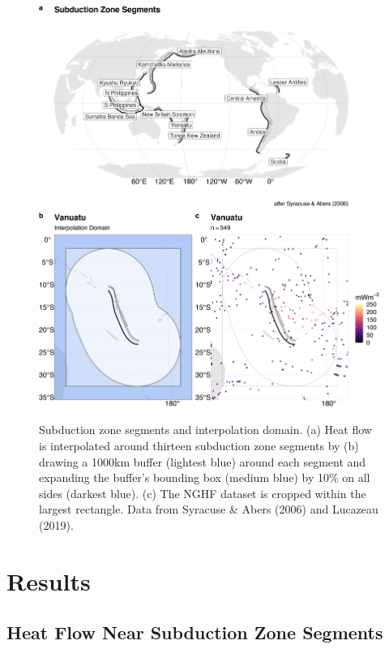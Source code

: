 \documentclass[draft,linenumbers]{agujournal2018}
\begin{document}
\begin{figure}[h]

{\centering \includegraphics[width=1\linewidth,]{../figs/base/segs_comp} 

}

\caption{Subduction zone segments and interpolation domain. (a) Heat flow is interpolated around thirteen subduction zone segments by (b) drawing a 1000km buffer (lightest blue) around each segment and expanding the buffer's bounding box (medium blue) by 10\% on all sides (darkest blue). (c) The NGHF dataset is cropped within the largest rectangle. Data from Syracuse \& Abers (2006) and Lucazeau (2019).}\label{fig:segments}
\end{figure}

\clearpage

\section{Results}

\subsection{Heat Flow Near Subduction Zone Segments}
\end{document}
